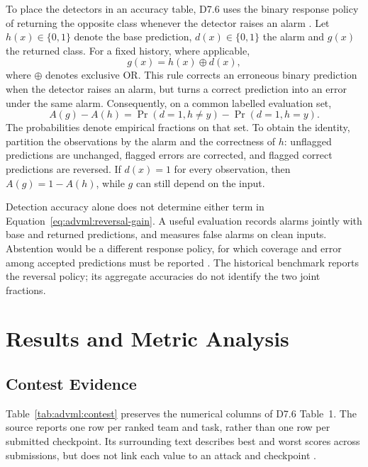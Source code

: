 To place the detectors in an accuracy table, D7.6 uses the binary response policy of returning
the opposite class whenever the detector raises an alarm \cite{sparta2022d76}. Let
$h(x)\in\{0,1\}$ denote the base prediction, $d(x)\in\{0,1\}$ the alarm and $g(x)$ the
returned class. For a fixed history, where applicable,
\begin{equation}
  g(x)=h(x)\oplus d(x),
  \label{eq:advml:reversal}
\end{equation}
where $\oplus$ denotes exclusive OR. This rule corrects an erroneous binary prediction when
the detector raises an alarm, but turns a correct prediction into an error under the same
alarm. Consequently, on a common labelled evaluation set,
\begin{equation}
  A(g)-A(h)
  =\Pr(d=1,h\neq y)-\Pr(d=1,h=y).
  \label{eq:advml:reversal-gain}
\end{equation}
The probabilities denote empirical fractions on that set. To obtain the identity, partition
the observations by the alarm and the correctness of $h$: unflagged predictions are unchanged,
flagged errors are corrected, and flagged correct predictions are reversed. If $d(x)=1$ for
every observation, then $A(g)=1-A(h)$, while $g$ can still depend on the input.

Detection accuracy alone does not determine either term in
Equation~\ref{eq:advml:reversal-gain}. A useful evaluation records alarms jointly with base
and returned predictions, and measures false alarms on clean inputs. Abstention would be a
different response policy, for which coverage and error among accepted predictions must be
reported \cite{carlini2019evaluating}. The historical benchmark reports the reversal policy;
its aggregate accuracies do not identify the two joint fractions.

\section{Results and Metric Analysis}
\label{sec:advml:8}

\subsection{Contest Evidence}
\label{sec:advml:8:contest}

Table~\ref{tab:advml:contest} preserves the numerical columns of D7.6 Table~1. The source
reports one row per ranked team and task, rather than one row per submitted checkpoint.
Its surrounding text describes best and worst scores across submissions, but does not link
each value to an attack and checkpoint \cite{sparta2022d76}.

